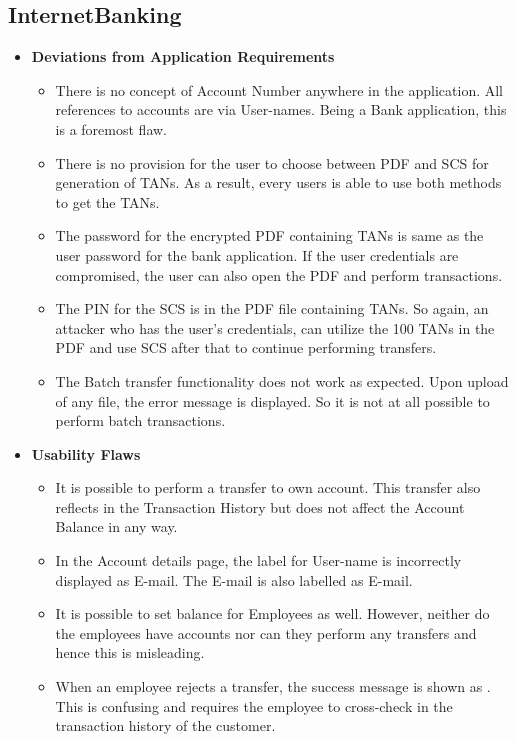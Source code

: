 \subsection{InternetBanking}

\begin{itemize}
    \item \textbf{Deviations from Application Requirements}
        \begin{itemize}
            \item There is no concept of Account Number anywhere in the application. All references to accounts are via User-names. Being a Bank application, this is a foremost flaw.
            \item There is no provision for the user to choose between PDF and SCS for generation of TANs. As a result, every users is able to use both methods to get the TANs.
            \item The password for the encrypted PDF containing TANs is same as the user password for the bank application. If the user credentials are compromised, the user can also open the PDF and perform transactions.
            \item The PIN for the SCS is in the PDF file containing TANs. So again, an attacker who has the user’s credentials, can utilize the 100 TANs in the PDF and use SCS after that to continue performing transfers.
            \item The Batch transfer functionality does not work as expected. Upon upload of any file, the error message  is displayed. So it is not at all possible to perform batch transactions.
        \end{itemize}
    \item \textbf{Usability Flaws}
        \begin{itemize}
            \item It is possible to perform a transfer to own account. This transfer also reflects in the Transaction History but does not affect the Account Balance in any way.
            \item In the Account details page, the label for User-name is incorrectly displayed as E-mail. The E-mail is also labelled as E-mail.
            \item It is possible to set balance for Employees as well. However, neither do the employees have accounts nor can they perform any transfers and hence this is misleading.
            \item When an employee rejects a transfer, the success message is shown as . This is confusing and requires the employee to cross-check in the transaction history of the customer.

\end{itemize}
\end{itemize}
